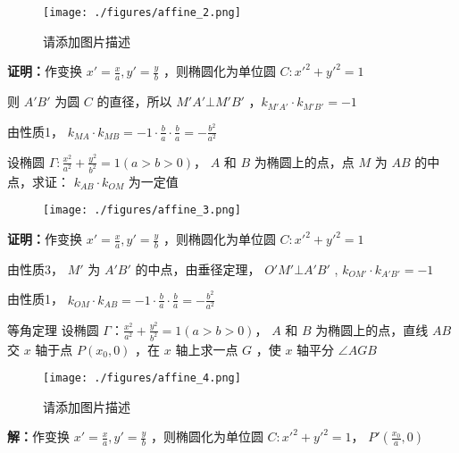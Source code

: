 \begin{corollary}{}
\begin{corollary}{}
\begin{figure}[ht]
\centering
\texttt{[image: ./figures/affine\_2.png]}
\caption{请添加图片描述} \label{affine_fig2}
\end{figure}

\textbf{证明：}作变换 $\displaystyle{x'=\frac{x}{a},y'=\frac{y}{b}}$ ，则椭圆化为单位圆 $\displaystyle{C:x'^2+y'^2=1}$

则 $\displaystyle{A'B'}$ 为圆 $\displaystyle{C}$ 的直径，所以 $\displaystyle{M'A'\bot M'B'}$ ，$\displaystyle{k_{M'A'}\cdot k_{M'B'}=-1}$

由性质1， $\displaystyle{k_{MA}\cdot k_{MB}=-1\cdot \frac{b}{a}\cdot \frac{b}{a}=-\frac{b^2}{a^2}}$

\end{corollary}

\begin{corollary}{}
设椭圆 $\displaystyle{\Gamma:\frac{x^2}{a^2}+\frac{y^2}{b^2}=1(a>b>0)}$， $\displaystyle{A}$ 和 $\displaystyle{B}$ 为椭圆上的点，点 $\displaystyle{M}$ 为 $\displaystyle{AB}$ 的中点，求证： $\displaystyle{k_{AB}\cdot k_{OM}}$ 为一定值

\begin{figure}[ht]
\centering
\texttt{[image: ./figures/affine\_3.png]}
\caption{} \label{affine_fig3}
\end{figure}

\textbf{证明：}作变换 $\displaystyle{x'=\frac{x}{a},y'=\frac{y}{b}}$ ，则椭圆化为单位圆 $\displaystyle{C:x'^2+y'^2=1}$

由性质3， $\displaystyle{M'}$ 为 $\displaystyle{A'B'}$ 的中点，由垂径定理， $\displaystyle{O'M'\bot A'B'}$ , $\displaystyle{k_{OM'}\cdot k_{A'B'}=-1}$

由性质1， $\displaystyle{k_{OM}\cdot k_{AB}=-1\cdot \frac{b}{a}\cdot \frac{b}{a}=-\frac{b^2}{a^2}}$

\end{corollary} 

\begin{corollary}{等角定理}
设椭圆 $\displaystyle{\Gamma：\frac{x^2}{a^2}+\frac{y^2}{b^2}=1(a>b>0)}$， $\displaystyle{A}$ 和 $\displaystyle{B}$ 为椭圆上的点，直线 $\displaystyle{AB}$ 交 $\displaystyle{x}$ 轴于点 $\displaystyle{P(x_0,0)}$ ，在 $\displaystyle{x}$ 轴上求一点 $\displaystyle{G}$ ，使 $\displaystyle{x}$ 轴平分 $\displaystyle{\angle AGB}$ 

\begin{figure}[ht]
\centering
\texttt{[image: ./figures/affine\_4.png]}
\caption{请添加图片描述} \label{affine_fig4}
\end{figure}
\textbf{解：}作变换 $\displaystyle{x'=\frac{x}{a},y'=\frac{y}{b}}$ ，则椭圆化为单位圆 $\displaystyle{C:x'^2+y'^2=1}$， $\displaystyle{P'\left(\frac{x_0}{a},0 \right)}$ 


\end{corollary}
\end{corollary}

